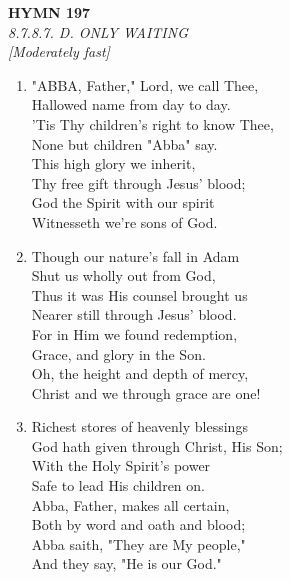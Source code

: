 \newpage
\begin{center}
    {\Large \textbf{HYMN 197}}
    \\
    \textit{8.7.8.7. D. ONLY WAITING}
    \\
    \textit{\small [Moderately fast]}
\end{center}
\vspace{1em}

\begin{enumerate}
    \item "ABBA, Father," Lord, we call Thee, \\
        Hallowed name from day to day. \\
        'Tis Thy children's right to know Thee, \\
        None but children "Abba" say. \\
        This high glory we inherit, \\
        Thy free gift through Jesus' blood; \\
        God the Spirit with our spirit \\
        Witnesseth we're sons of God.

    \item Though our nature's fall in Adam \\
        Shut us wholly out from God, \\
        Thus it was His counsel brought us \\
        Nearer still through Jesus' blood. \\
        For in Him we found redemption, \\
        Grace, and glory in the Son. \\
        Oh, the height and depth of mercy, \\
        Christ and we through grace are one!

    \item Richest stores of heavenly blessings \\
        God hath given through Christ, His Son; \\
        With the Holy Spirit's power \\
        Safe to lead His children on. \\
        Abba, Father, makes all certain, \\
        Both by word and oath and blood; \\
        Abba saith, "They are My people," \\
        And they say, "He is our God."


\end{enumerate}
